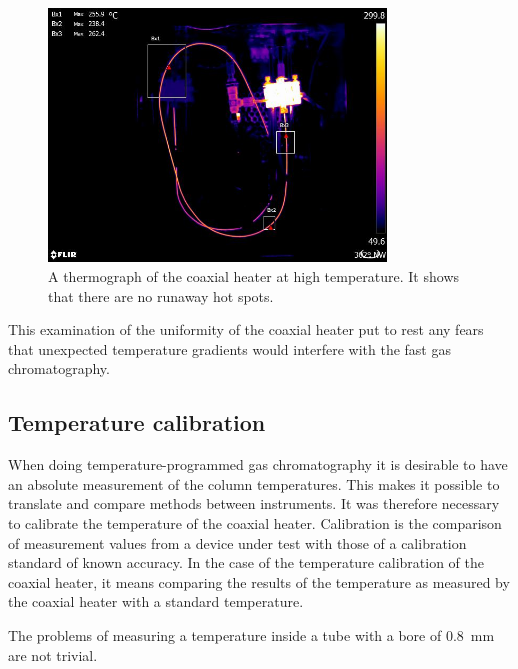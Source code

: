 \begin{figure}
	\centering
	\includegraphics[width=0.8\textwidth]{./Figures/ThermalImage}
	\decoRule
	
\caption[A thermograph of the coaxial heater at temperature]{A thermograph of
the coaxial heater at high temperature. It shows that there are no runaway hot
spots.}
	
	\label{fig:ThermalImage}
\end{figure}

This examination of the uniformity of the coaxial heater put to rest any fears
that unexpected temperature gradients would interfere with the fast gas
chromatography.

\subsection{Temperature calibration}

When doing temperature-programmed gas chromatography it is desirable to have an
absolute measurement of the column temperatures. This makes it possible to
translate and compare methods between instruments. It was therefore necessary to
calibrate the temperature of the coaxial heater. Calibration is the comparison
of measurement values from a device under test with those of a calibration
standard of known accuracy. In the case of the temperature calibration of the
coaxial heater, it means comparing the results of the temperature as measured by
the coaxial heater with a standard temperature.

The problems of measuring a temperature inside a tube with a bore of
\SI{0.8}{\milli\metre} are not trivial.


